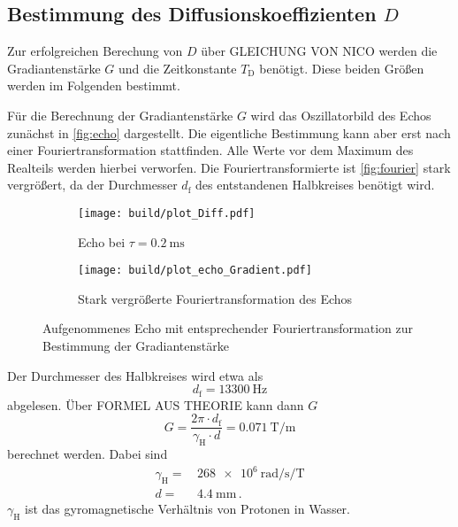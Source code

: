 \subsection{Bestimmung des Diffusionskoeffizienten \texorpdfstring{$D$}{D}}
\label{ssec:aus3}

Zur erfolgreichen Berechung von $D$ über GLEICHUNG VON NICO werden die Gradiantenstärke $G$ und die Zeitkonstante $T_\text{D}$ benötigt. 
Diese beiden Größen werden im Folgenden bestimmt.

Für die Berechnung der Gradiantenstärke $G$ wird das Oszillatorbild des Echos zunächst in \autoref{fig:echo} dargestellt.
Die eigentliche Bestimmung kann aber erst nach einer Fouriertransformation stattfinden. 
Alle Werte vor dem Maximum des Realteils werden hierbei verworfen.
Die Fouriertransformierte ist \autoref{fig:fourier} stark vergrößert, da der Durchmesser $d_\text{f}$ des entstandenen Halbkreises benötigt wird.

\begin{figure}
    \centering
    \begin{subfigure}{0.4\textwidth}
        \centering
        \texttt{[image: build/plot\_Diff.pdf]}
        \caption{Echo bei $\tau = \SI{0.2}{\milli\second}$}
        \label{fig:echo}
    \end{subfigure}
    \begin{subfigure}{0.4\textwidth}
        \centering
        \texttt{[image: build/plot\_echo\_Gradient.pdf]}
        \caption{Stark vergrößerte Fouriertransformation des Echos}
        \label{fig:fourier}
    \end{subfigure}
    \caption{Aufgenommenes Echo mit entsprechender Fouriertransformation zur Bestimmung der Gradiantenstärke}
    \label{fig:g_messung}
\end{figure}

Der Durchmesser des Halbkreises wird etwa als 
\begin{equation*}
    d_\text{f} = \SI{13300}{\hertz} 
    \label{eq:df}
\end{equation*}
abgelesen.
Über FORMEL AUS THEORIE kann dann $G$ 
\begin{equation}
    G = \frac{2 \pi \cdot d_\text{f}}{\gamma _\text{H} \cdot d} = \SI{0.071}{\tesla\per\meter}
    \label{eq:g_wert}
\end{equation}
berechnet werden.
Dabei sind
\begin{align*}
    \gamma _\text{H} =& \, \SI{268e6}{\radian\per\second\per\tesla} \\
    d =& \, \SI{4.4}{\milli\meter} \, . 
\end{align*}
$\gamma _\text{H}$ ist das gyromagnetische Verhältnis von Protonen in Wasser. \cite{physics_constants}

